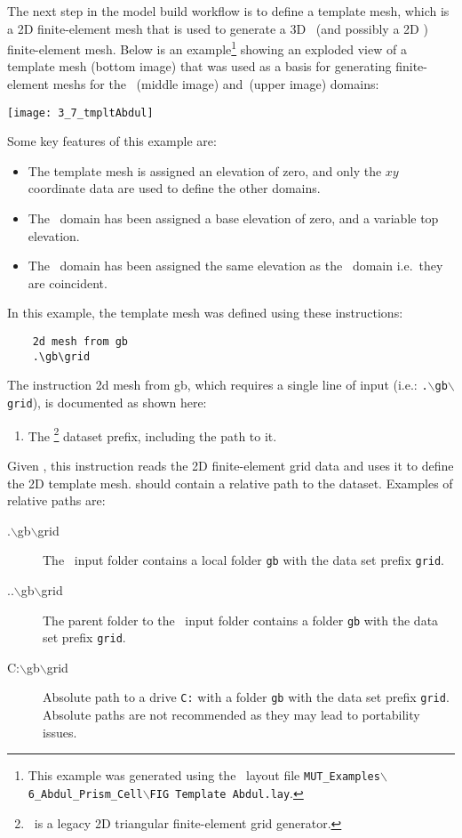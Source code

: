 \label{texfile:TemplateMesh}
The next step in the model build workflow is to define a template mesh, which is a 2D finite-element mesh that is used to generate a 3D \gwf\ (and possibly a 2D \swf) finite-element mesh.   Below is an example\footnote{This example was generated using the \tecplot\ layout file \texttt{MUT\_Examples$\backslash$6\_Abdul\_Prism\_Cell$\backslash$FIG Template Abdul.lay}. }
  showing an exploded view of a template mesh (bottom image) that was used as a basis for generating  finite-element meshs for the \gwf\ (middle image) and\swf\ (upper image) domains:

    \texttt{[image: 3\_7\_tmpltAbdul]}

Some key features of this example are:
\begin{itemize}
  \item The template mesh is assigned an elevation of zero, and only the $xy$ coordinate data are used to define the other domains.
  \item The \gwf\ domain has been assigned a base elevation of zero, and a variable top elevation.
  \item The \swf\ domain has been assigned the same elevation as the \gwf\ domain i.e.\ they are coincident.
\end{itemize}

 In this example, the template mesh was defined using these instructions:
 \squish
\begin{verbatim}
    2d mesh from gb
    .\gb\grid
\end{verbatim}
The instruction \textsf{2d mesh from gb}, which requires a single line of input (i.e.: \texttt{.$\backslash$gb$\backslash$grid}), is documented as shown here:

    {
        \squish
        \begin{enumerate}
        \item {}  The \gb\footnote{\gb\ is a legacy 2D triangular finite-element grid generator.} dataset prefix, including the path to it.
        \end{enumerate}
        Given , this instruction reads the 2D finite-element grid data and uses it to define the 2D template mesh.   should contain a relative path to the dataset.  Examples of relative paths are:
        \begin{description}
        \item[.$\backslash$gb$\backslash$grid] The \mut\ input folder contains a local folder \texttt{gb} with the data set prefix \texttt{grid}.
        \item[..$\backslash$gb$\backslash$grid] The parent folder to the \mut\ input folder contains a folder \texttt{gb} with the data set prefix \texttt{grid}.
        \item[C:$\backslash$gb$\backslash$grid] Absolute path to a drive \texttt{C:} with a folder \texttt{gb} with the data set prefix \texttt{grid}.  Absolute paths are not recommended as they may lead to portability issues.
        \end{description}
        \squish
    }

